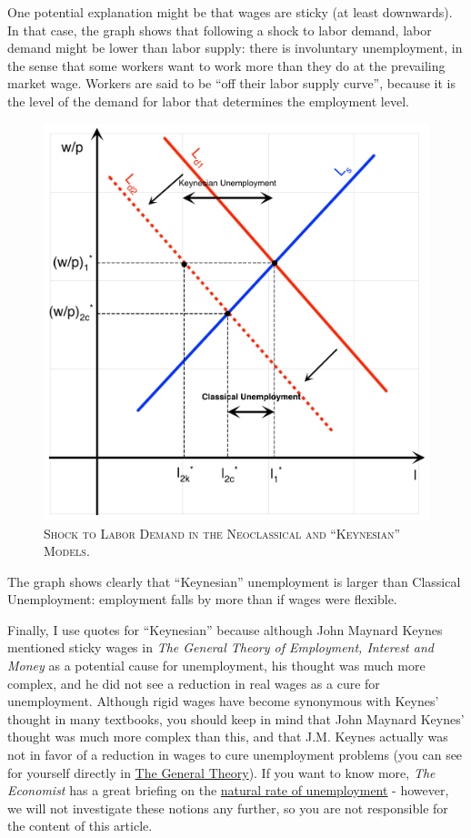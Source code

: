 \documentclass[]{book}
\theoremstyle{definition}
\theoremstyle{definition}
\theoremstyle{definition}
\theoremstyle{remark}
\begin{document}
One potential explanation might be that wages are sticky (at least
downwards). In that case, the graph shows that following a shock to
labor demand, labor demand might be lower than labor supply: there is
involuntary unemployment, in the sense that some workers want to work
more than they do at the prevailing market wage. Workers are said to be
``off their labor supply curve'', because it is the level of the demand
for labor that determines the employment level.




\begin{figure}

{\centering \includegraphics[width=0.75\linewidth]{graphsketcher/labor-market-productivity-shock-keynes} 

}

\caption{\textsc{Shock to Labor Demand in the
Neoclassical and ``Keynesian'' Models}.}\label{fig:shock-labor-demand}
\end{figure}

The graph shows clearly that ``Keynesian'' unemployment is larger than
Classical Unemployment: employment falls by more than if wages were
flexible.

Finally, I use quotes for ``Keynesian'' because although John Maynard
Keynes mentioned sticky wages in \emph{The General Theory of Employment,
Interest and Money} as a potential cause for unemployment, his thought
was much more complex, and he did not see a reduction in real wages as a
cure for unemployment. Although rigid wages have become synonymous with
Keynes' thought in many textbooks, you should keep in mind that John
Maynard Keynes' thought was much more complex than this, and that J.M.
Keynes actually was not in favor of a reduction in wages to cure
unemployment problems (you can see for yourself directly in
\href{http://cas2.umkc.edu/economics/people/facultypages/kregel/courses/econ645/winter2011/generaltheory.pdf}{The
General Theory}). If you want to know more, \emph{The Economist} has a
great briefing on the
\href{https://www.economist.com/economics-brief/2017/08/26/the-natural-rate-of-unemployment}{natural
rate of unemployment} - however, we will not investigate these notions
any further, so you are not responsible for the content of this article.
\end{document}
